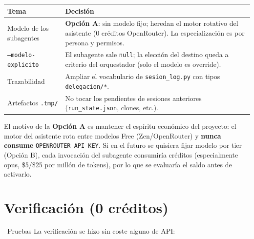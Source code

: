 \documentclass[11pt,a4paper]{article}
\newcommand{\iconotexto}[2]{\textcolor{cyanNeon}{\faIcon{#1}}~#2}
\begin{document}
\begin{tcolorbox}[tarjetaDato, title={\faIcon{clipboard-check}~Decisiones de la sesión}]
\begin{tabularx}{\linewidth}{@{}l X@{}}
\toprule
\textbf{Tema} & \textbf{Decisión} \\
\midrule
Modelo de los subagentes & \textbf{Opción A}: sin modelo fijo; heredan el motor
rotativo del asistente (0 créditos OpenRouter). La especialización es por persona y
permisos. \\
\texttt{--modelo-explicito} & El subagente sale \texttt{null}; la elección del destino
queda a criterio del orquestador (solo el modelo es override). \\
Trazabilidad & Ampliar el vocabulario de \texttt{sesion\_log.py} con tipos
\texttt{delegacion/*}. \\
Artefactos \texttt{.tmp/} & No tocar los pendientes de sesiones anteriores
(\texttt{run\_state.json}, clones, etc.). \\
\bottomrule
\end{tabularx}
\end{tcolorbox}

\begin{tcolorbox}[cajaRecuerda]
El motivo de la \textbf{Opción A} es mantener el espíritu económico del proyecto: el
motor del asistente rota entre modelos Free (Zen/OpenRouter) y \textbf{nunca consume}
\texttt{OPENROUTER\_API\_KEY}. Si en el futuro se quisiera fijar modelo por tier
(Opción B), cada invocación del subagente consumiría créditos (especialmente opus,
\$5/\$25 por millón de tokens), por lo que se evaluaría el saldo antes de activarlo.
\end{tcolorbox}

\section{Verificación (0 créditos)}

\iconotexto{flask}{Pruebas} La verificación se hizo sin coste alguno de API:
\end{document}
